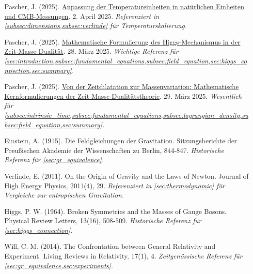 \documentclass[12pt,a4paper]{article}
\begin{document}
\begin{thebibliography}{9}
		 Pascher, J. (2025). \href{https://github.com/jpascher/T0-Time-Mass-Duality/tree/main/2/pdf/Deutsch/TempEinheitenCMB.pdf}{Anpassung der Temperatureinheiten in natürlichen Einheiten und CMB-Messungen}. 2. April 2025. \textit{Referenziert in \cref{subsec:dimensions,subsec:verlinde} für Temperaturskalierung.}
		
		 Pascher, J. (2025). \href{https://github.com/jpascher/T0-Time-Mass-Duality/tree/main/2/pdf/Deutsch/MathHiggsZeitMasse.pdf}{Mathematische Formulierung des Higgs-Mechanismus in der Zeit-Masse-Dualität}. 28. März 2025. \textit{Wichtige Referenz für \cref{sec:introduction,subsec:fundamental_equations,subsec:field_equation,sec:higgs_connection,sec:summary}.}
		
		 Pascher, J. (2025). \href{https://github.com/jpascher/T0-Time-Mass-Duality/tree/main/2/pdf/Deutsch/MathZeitMasseLagrange.pdf}{Von der Zeitdilatation zur Massenvariation: Mathematische Kernformulierungen der Zeit-Masse-Dualitätstheorie}. 29. März 2025. \textit{Wesentlich für \cref{subsec:intrinsic_time,subsec:fundamental_equations,subsec:lagrangian_density,subsec:field_equation,sec:summary}.}
		
		 Einstein, A. (1915). Die Feldgleichungen der Gravitation. Sitzungsberichte der Preußischen Akademie der Wissenschaften zu Berlin, 844-847. \textit{Historische Referenz für \cref{sec:gr_equivalence}.}
		
		 Verlinde, E. (2011). On the Origin of Gravity and the Laws of Newton. Journal of High Energy Physics, 2011(4), 29. \textit{Referenziert in \cref{sec:thermodynamic} für Vergleiche zur entropischen Gravitation.}
		
		 Higgs, P. W. (1964). Broken Symmetries and the Masses of Gauge Bosons. Physical Review Letters, 13(16), 508-509. \textit{Historische Referenz für \cref{sec:higgs_connection}.}
		
		 Will, C. M. (2014). The Confrontation between General Relativity and Experiment. Living Reviews in Relativity, 17(1), 4. \textit{Zeitgenössische Referenz für \cref{sec:gr_equivalence,sec:experiments}.}
	\end{thebibliography}
	
\end{document}
